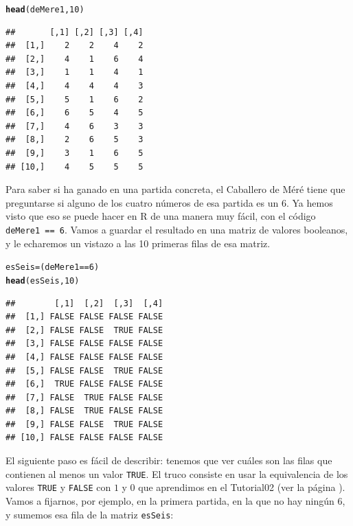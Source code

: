 \documentclass[10pt,a4paper]{article}\usepackage[]{graphicx}\usepackage[]{color}
\makeatletter
\newcommand{\hlnum}[1]{\textcolor[rgb]{0.686,0.059,0.569}{#1}}%
\newcommand{\hlopt}[1]{\textcolor[rgb]{0,0,0}{#1}}%
\newcommand{\hlstd}[1]{\textcolor[rgb]{0.345,0.345,0.345}{#1}}%
\newcommand{\hlkwb}[1]{\textcolor[rgb]{0.69,0.353,0.396}{#1}}%
\newcommand{\hlkwd}[1]{\textcolor[rgb]{0.737,0.353,0.396}{\textbf{#1}}}%
\newenvironment{kframe}{%
 \def\at@end@of@kframe{}%
 \ifinner\ifhmode%
  \def\at@end@of@kframe{\end{minipage}}%
  \begin{minipage}{\columnwidth}%
 \fi\fi%
 \def\FrameCommand##1{\hskip\@totalleftmargin \hskip-\fboxsep
 \colorbox{shadecolor}{##1}\hskip-\fboxsep
     \hskip-\linewidth \hskip-\@totalleftmargin \hskip\columnwidth}%
 \MakeFramed {\advance\hsize-\width
   \@totalleftmargin\z@ \linewidth\hsize
   \@setminipage}}%
 {\par\unskip\endMakeFramed%
 \at@end@of@kframe}
\newenvironment{knitrout}{}{} %
\newcounter {cont01}
\makeatother
\begin{document}
\begin{knitrout}
\color{fgcolor}\begin{kframe}
\begin{alltt}
\hlkwd{head}\hlstd{(deMere1,} \hlnum{10}\hlstd{)}
\end{alltt}
\begin{verbatim}
##       [,1] [,2] [,3] [,4]
##  [1,]    2    2    4    2
##  [2,]    4    1    6    4
##  [3,]    1    1    4    1
##  [4,]    4    4    4    3
##  [5,]    5    1    6    2
##  [6,]    6    5    4    5
##  [7,]    4    6    3    3
##  [8,]    2    6    5    3
##  [9,]    3    1    6    5
## [10,]    4    5    5    5
\end{verbatim}
\end{kframe}
\end{knitrout}
                                                                                                                                                                 Para saber si ha ganado en una partida concreta, el Caballero de Méré tiene que preguntarse si alguno de los cuatro números de esa partida es un 6. Ya hemos visto que eso se puede hacer en R de una manera muy fácil, con el código {\tt deMere1 == 6}. Vamos a guardar el resultado en una matriz de valores booleanos, y le echaremos un vistazo a las 10 primeras filas de esa matriz.
\begin{knitrout}
\color{fgcolor}\begin{kframe}
\begin{alltt}
     \hlstd{esSeis} \hlkwb{=} \hlstd{(deMere1} \hlopt{==} \hlnum{6}\hlstd{)}
\hlkwd{head}\hlstd{(esSeis,} \hlnum{10}\hlstd{)}
\end{alltt}
\begin{verbatim}
##        [,1]  [,2]  [,3]  [,4]
##  [1,] FALSE FALSE FALSE FALSE
##  [2,] FALSE FALSE  TRUE FALSE
##  [3,] FALSE FALSE FALSE FALSE
##  [4,] FALSE FALSE FALSE FALSE
##  [5,] FALSE FALSE  TRUE FALSE
##  [6,]  TRUE FALSE FALSE FALSE
##  [7,] FALSE  TRUE FALSE FALSE
##  [8,] FALSE  TRUE FALSE FALSE
##  [9,] FALSE FALSE  TRUE FALSE
## [10,] FALSE FALSE FALSE FALSE
\end{verbatim}
\end{kframe}
\end{knitrout}
                                                                                                                                                                 El siguiente paso es fácil de describir: tenemos que ver cuáles son las filas que contienen al menos un valor {\tt TRUE}. El truco consiste en usar la equivalencia de los valores {\tt TRUE} y {\tt FALSE} con $1$ y $0$ que aprendimos en el Tutorial02 (ver la página  \pageref{tut02-tut02:subsubsec:BooleanosComoUnosCeros}). Vamos a fijarnos, por ejemplo, en la primera partida, en la que no hay ningún $6$, y sumemos esa fila de la matriz {\tt esSeis}:
\end{document}
